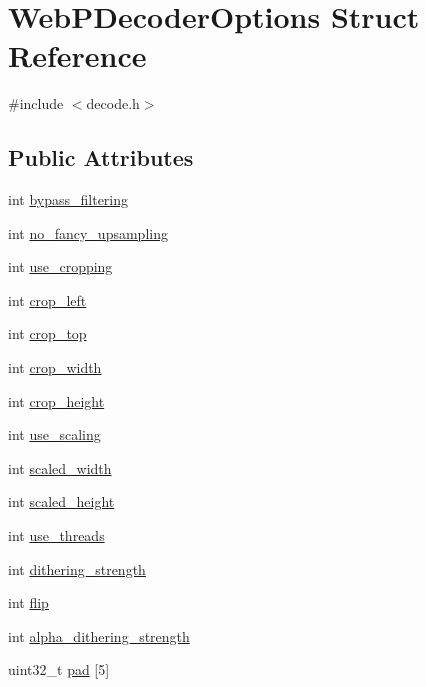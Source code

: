 \hypertarget{struct_web_p_decoder_options}{}\section{Web\+P\+Decoder\+Options Struct Reference}
\label{struct_web_p_decoder_options}


{\ttfamily \#include $<$decode.\+h$>$}

\subsection*{Public Attributes}
\begin{DoxyCompactItemize}
\item 
int \mbox{\hyperlink{struct_web_p_decoder_options_aa7198600635eb131715a00d9b84b597e}{bypass\+\_\+filtering}}
\item 
int \mbox{\hyperlink{struct_web_p_decoder_options_a76cd8b191fa024dec964cc83b3a915a9}{no\+\_\+fancy\+\_\+upsampling}}
\item 
int \mbox{\hyperlink{struct_web_p_decoder_options_a8cd44d127f1031145d5051d103318d6e}{use\+\_\+cropping}}
\item 
int \mbox{\hyperlink{struct_web_p_decoder_options_a20a29b56e5d3f0a90a15930ae7875ab1}{crop\+\_\+left}}
\item 
int \mbox{\hyperlink{struct_web_p_decoder_options_af6a5e6b6473fa67211d124fbf4a5136b}{crop\+\_\+top}}
\item 
int \mbox{\hyperlink{struct_web_p_decoder_options_a40f7ea075b4ead6c8bd671d9c91fb494}{crop\+\_\+width}}
\item 
int \mbox{\hyperlink{struct_web_p_decoder_options_a410f836b3b87a662195609ebc2597567}{crop\+\_\+height}}
\item 
int \mbox{\hyperlink{struct_web_p_decoder_options_a5ca628fdd33d53dc40d80904b2c9c161}{use\+\_\+scaling}}
\item 
int \mbox{\hyperlink{struct_web_p_decoder_options_aa9fb6586ac98345674332366be2da1d8}{scaled\+\_\+width}}
\item 
int \mbox{\hyperlink{struct_web_p_decoder_options_a5ab8c5c46589aaf86c084d341a77d03c}{scaled\+\_\+height}}
\item 
int \mbox{\hyperlink{struct_web_p_decoder_options_ae1c9cbad64a9a92823d1bc1d03318a52}{use\+\_\+threads}}
\item 
int \mbox{\hyperlink{struct_web_p_decoder_options_a95b1babff1cd4f4faf2142e4a02e03e1}{dithering\+\_\+strength}}
\item 
int \mbox{\hyperlink{struct_web_p_decoder_options_af0aad48dc78f4db143d32f6e2222a498}{flip}}
\item 
int \mbox{\hyperlink{struct_web_p_decoder_options_a8046519c2ccb8d48ef43580e1d318a42}{alpha\+\_\+dithering\+\_\+strength}}
\item 
uint32\+\_\+t \mbox{\hyperlink{struct_web_p_decoder_options_ad77c24ba77e0d50e286d425101b3d69e}{pad}} \mbox{[}5\mbox{]}
\end{DoxyCompactItemize}


